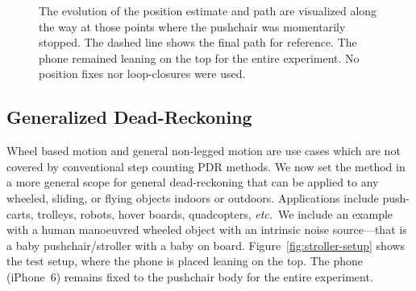 \documentclass[conference]{ieeetran}
\newcommand{\etc}{\textit{etc.}}
\newlength\figureheight
\newlength\figurewidth
\begin{document}
\begin{figure}[!t]
  \tikzexternaldisable




  \setlength{\figurewidth}{.84\columnwidth}
  \setlength{\figureheight}{0.7507\figurewidth}


  \footnotesize\centering%


  


  


  
  \tikzexternalenable
  \caption{The evolution of the position estimate and path are visualized along the way at those points where the pushchair was momentarily stopped. The dashed line shows the final path for reference. The phone remained leaning on the top for the entire experiment. No position fixes nor loop-closures were used.}
  \vspace*{-2em}
  \label{fig:stroller} 
\end{figure}





\subsection{Generalized Dead-Reckoning}
\noindent
Wheel based motion and general non-legged motion are use cases which are not covered by conventional step counting PDR methods. We now set the method in a more general scope for general dead-reckoning that can be applied to any wheeled, sliding, or flying objects indoors or outdoors. Applications include push-carts, trolleys, robots, hover boards, quadcopters, \etc\
We include an example with a human manoeuvred wheeled object with an intrinsic noise source---that is a baby pushchair/stroller with a baby on board. Figure~\ref{fig:stroller-setup} shows the test setup, where the phone is placed leaning on the top. The phone (iPhone~6) remains fixed to the pushchair body for the entire experiment.
\end{document}
